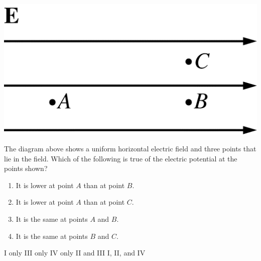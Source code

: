 \begin{center}
\includegraphics[scale=0.25]{images/img-015-028.png}
\end{center}

\begin{questions}\setcounter{question}{34}\question
The diagram above shows a uniform horizontal electric field and three points that lie in the field. Which of the following is true of the electric potential at the points shown?

\begin{enumerate}
    \item It is lower at point $A$ than at point $B$.
    \item It is lower at point $A$ than at point $C$.
    \item It is the same at points $A$ and $B$.
    \item It is the same at points $B$ and $C$.
\end{enumerate}

\begin{oneparchoices}
\choice I only
\choice III only
\choice IV only
\choice II and III
\choice I, II, and IV
\end{oneparchoices}\end{questions}

